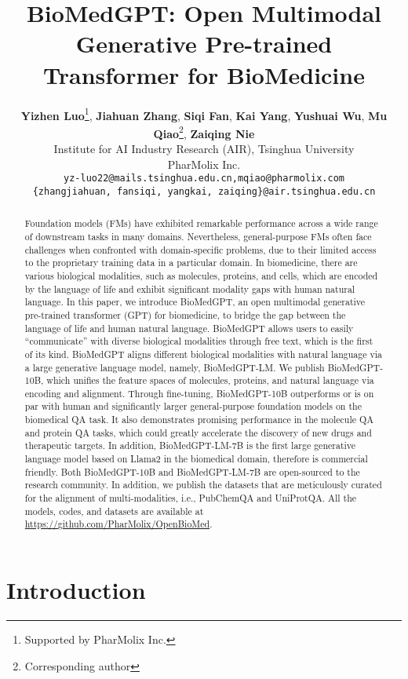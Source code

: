 \documentclass{article}
\title{BioMedGPT: Open Multimodal Generative Pre-trained Transformer for BioMedicine}
\author{\textbf{Yizhen Luo}\thanks{\quad Supported by PharMolix Inc.}\enspace, 
    \textbf{Jiahuan Zhang}\footnotemark[1]\enspace, 
    \textbf{Siqi Fan}\footnotemark[1]\enspace, 
    \textbf{Kai Yang}\footnotemark[1]\enspace, 
    \textbf{Yushuai Wu}\footnotemark[1]\enspace, 
    \textbf{Mu Qiao}\thanks{\quad Corresponding author}\enspace, 
    \textbf{Zaiqing Nie}\footnotemark[2]\\
    Institute for AI Industry Research (AIR), Tsinghua University\\
PharMolix Inc. \\
    \texttt{yz-luo22@mails.tsinghua.edu.cn,}\enspace \texttt{mqiao@pharmolix.com}\\
    \texttt{\{zhangjiahuan, fansiqi, yangkai, zaiqing\}@air.tsinghua.edu.cn}\\
}
\date{}
\begin{document}
\maketitle

\begin{abstract}
Foundation models (FMs) have exhibited remarkable performance across a wide range of downstream tasks in many domains. Nevertheless, general-purpose FMs often face challenges when confronted with domain-specific problems, due to their limited access to the proprietary training data in a particular domain. In biomedicine, there are various biological modalities, such as molecules, proteins, and cells, which are encoded by the language of life and exhibit significant modality gaps with human natural language. In this paper, we introduce BioMedGPT, an open multimodal generative pre-trained transformer (GPT) for biomedicine, to bridge the gap between the language of life and human natural language. BioMedGPT allows users to easily ``communicate'' with diverse biological modalities through free text, which is the first of its kind. BioMedGPT aligns different biological modalities with natural language via a large generative language model, namely, BioMedGPT-LM. We publish BioMedGPT-10B, which unifies the feature spaces of molecules, proteins, and natural language via encoding and alignment. Through fine-tuning, BioMedGPT-10B outperforms or is on par with human and significantly larger general-purpose foundation models on the biomedical QA task. It also demonstrates promising performance in the molecule QA and protein QA tasks, which could greatly accelerate the discovery of new drugs and therapeutic targets. In addition, BioMedGPT-LM-7B is the first large generative language model based on Llama2 in the biomedical domain, therefore is commercial friendly. Both BioMedGPT-10B and BioMedGPT-LM-7B are open-sourced to the research community. In addition, we publish the datasets that are meticulously curated for the alignment of multi-modalities, i.e., PubChemQA and UniProtQA. All the models, codes, and datasets are available at \url{https://github.com/PharMolix/OpenBioMed}.



\end{abstract} 



\section{Introduction}
\end{document}
